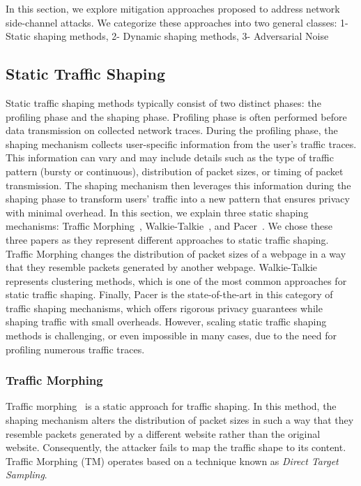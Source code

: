 In this section, we explore mitigation approaches proposed to address network side-channel attacks. 
We categorize these approaches into two general classes: 1- Static shaping methods, 2- Dynamic shaping methods, 3- Adversarial Noise 



\subsection{Static Traffic Shaping}\label{subsec:static-traffic-shaping}
Static traffic shaping methods typically consist of two distinct phases: the profiling phase and the shaping phase.
Profiling phase is often performed before data transmission on collected network traces.  
During the profiling phase, the shaping mechanism collects user-specific information from the user's traffic traces.
This information can vary and may include details such as the type of traffic pattern (\ie bursty or continuous), distribution of packet sizes, or timing of packet transmission.
The shaping mechanism then leverages this information during the shaping phase to transform users' traffic into a new pattern that ensures privacy with minimal overhead.
In this section, we explain three static shaping mechanisms: Traffic Morphing~\cite{wright2009traffic}, Walkie-Talkie~\cite{wang2017walkie}, and Pacer~\cite{mehta2022pacer}.
We chose these three papers as they represent different approaches to static traffic shaping.
Traffic Morphing changes the distribution of packet sizes of a webpage in a way that they resemble packets generated by another webpage.
Walkie-Talkie represents clustering methods, which is one of the most common approaches for static traffic shaping.
Finally, Pacer is the state-of-the-art in this category of traffic shaping mechanisms, which offers rigorous privacy guarantees while shaping traffic with small overheads.   
However, scaling static traffic shaping methods is challenging, or even impossible in many cases, due to the need for profiling numerous traffic traces.
\subsubsection{Traffic Morphing}\label{subsubsec:traffic-morphing}
Traffic morphing~\cite{wright2009traffic} is a static approach for traffic shaping. 
In this method, the shaping mechanism alters the distribution of packet sizes in such a way that they resemble packets generated by a different website rather than the original website.
Consequently, the attacker fails to map the traffic shape to its content. 
Traffic Morphing (TM) operates based on a technique known as \textit{Direct Target Sampling}.

